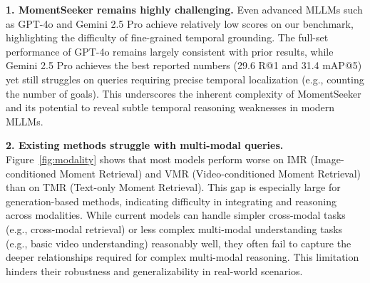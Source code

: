 \documentclass{article}
\begin{document}





\textbf{1. MomentSeeker remains highly challenging.}
Even advanced MLLMs such as GPT-4o and Gemini 2.5 Pro achieve relatively low scores on our benchmark, highlighting the difficulty of fine-grained temporal grounding. The full-set performance of GPT-4o remains largely consistent with prior results, while Gemini 2.5 Pro achieves the best reported numbers (29.6 R@1 and 31.4 mAP@5) yet still struggles on queries requiring precise temporal localization (e.g., counting the number of goals). This underscores the inherent complexity of MomentSeeker and its potential to reveal subtle temporal reasoning weaknesses in modern MLLMs.


\textbf{2. Existing methods struggle with multi-modal queries.}
Figure~\ref{fig:modality} shows that most models perform worse on IMR (Image-conditioned Moment Retrieval) and VMR (Video-conditioned Moment Retrieval) than on TMR (Text-only Moment Retrieval). This gap is especially large for generation-based methods, indicating difficulty in integrating and reasoning across modalities. While current models can handle simpler cross-modal tasks (e.g., cross-modal retrieval) or less complex multi-modal understanding tasks (e.g., basic video understanding) reasonably well, they often fail to capture the deeper relationships required for complex multi-modal reasoning. This limitation hinders their robustness and generalizability in real-world scenarios.
\end{document}
